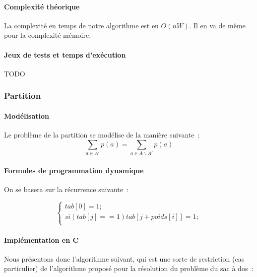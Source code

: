 \documentclass[a4paper, 12pt]{article}
\begin{document}
\paragraph{Complexité théorique}

La complexité en temps de notre algorithme est en $O(nW)$. Il en va de
même pour la complexité mémoire.

\paragraph{Jeux de tests et temps d'exécution}

TODO

\subsubsection{Partition}

\paragraph{Modélisation}

Le problème de la partition se modélise de la manière suivante~:
\begin{equation}
\sum_{a \in A'} p(a)= \sum_{a \in A
    \backslash A'}p(a)
\end{equation}

\paragraph{Formules de programmation dynamique}

On se basera sur la récurrence suivante~:

\begin{equation}
\begin{cases}
tab[0] = 1; \\
si ( tab[j] == 1 ) {
       tab[j + poids[i]] = 1;
     } \\
\end{cases}
\end{equation}

\paragraph{Implémentation en C}

Nous présentons donc l'algorithme suivant, qui est une sorte de
restriction (cas particulier) de l'algorithme proposé pour la
résolution du problème du sac à dos~:
\end{document}
